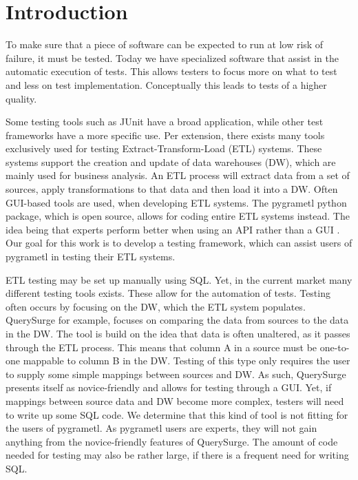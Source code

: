 \section{Introduction}\label{intro} %
To make sure that a piece of software can be expected to run at low risk of failure, it must be tested. Today we have specialized software that assist in the automatic execution of tests. This allows testers to focus more on what to test and less on test implementation. Conceptually this leads to tests of a higher quality.

Some testing tools such as JUnit have a broad application, while other test frameworks have a more specific use. Per extension, there exists many tools exclusively used for testing Extract-Transform-Load (ETL) systems. These systems support the creation and update of data warehouses (DW), which are mainly used for business analysis. An ETL process will extract data from a set of sources, apply transformations to that data and then load it into a DW. Often GUI-based tools are used, when developing ETL systems. The pygrametl python package, which is open source, allows for coding entire ETL systems instead. The idea being that experts perform better when using an API rather than a GUI \cite{thomsen2009pygrametl}. Our goal for this work is to develop a testing framework, which can assist users of pygrametl in testing their ETL systems.

ETL testing may be set up manually using SQL. Yet, in the current market many different testing tools exists. These allow for the automation of tests. Testing often occurs by focusing on the DW, which the ETL system populates. QuerySurge\cite{QuerySurge} for example, focuses on comparing the data from sources to the data in the DW. The tool is build on the idea that data is often unaltered, as it passes through the ETL process. This means that column A in a source must be one-to-one mappable to column B in the DW. Testing of this type only requires the user to supply some simple mappings between sources and DW. As such, QuerySurge presents itself as novice-friendly and allows for testing through a GUI. Yet, if mappings between source data and DW become more complex, testers will need to write up some SQL code. We determine that this kind of tool is not fitting for the users of pygrametl. As pygrametl users are experts, they will not gain anything from the novice-friendly features of QuerySurge. The amount of code needed for testing may also be rather large, if there is a frequent need for writing SQL.

